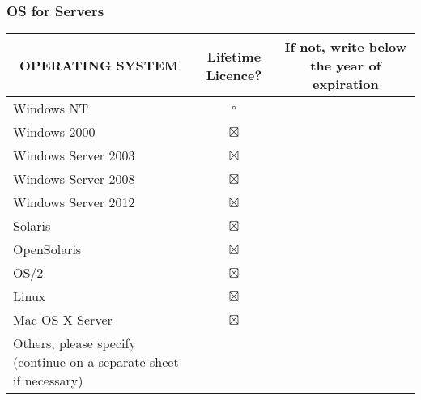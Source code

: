 \documentclass[a4paper,10pt, total={10.95in, 8in}]{article} %
\begin{document}
\subsubsection{OS for Servers}
\begin{table}[H]
\renewcommand{\arraystretch}{1.5}
\centering
\begin{adjustbox}{width=6.5in}
\begin{tabular}{|p{6.5cm}|c|l|}
\hline
\multicolumn{1}{|c|}{OPERATING SYSTEM}                             & Lifetime Licence? & \multicolumn{1}{c|}{If not, write below the year of expiration} \\ \hline
Windows NT                                                         & \Large$\square$       & \multicolumn{1}{c|}{\textbf{}}                                  \\ \hline
Windows 2000                                                       & \Large$\boxtimes$       & \multicolumn{1}{c|}{\textbf{}}                                  \\ \hline
Windows Server 2003                                                & \Large$\boxtimes$       & \multicolumn{1}{c|}{}                                           \\ \hline
Windows Server 2008                                                & \Large$\boxtimes$       & \multicolumn{1}{c|}{}                                           \\ \hline
Windows Server 2012                                                & \Large$\boxtimes$       &                                                                 \\ \hline
Solaris                                                            & \Large$\boxtimes$       &                                                                 \\ \hline
OpenSolaris                                                        & \Large$\boxtimes$       &                                                                 \\ \hline
OS/2                                                               & \Large$\boxtimes$       &                                                                 \\ \hline
Linux                                                              & \Large$\boxtimes$       &                                                                 \\ \hline
Mac OS X Server                                                    & \Large$\boxtimes$       &                                                                 \\ \hline
Others, please specify (continue on a separate sheet if necessary) &       &                                                                 \\ \hline
\end{tabular}
\end{adjustbox}
\end{table}
\end{document}
